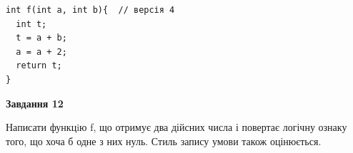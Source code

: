 \documentclass[12pt, ukrainian]{article}
\begin{document}
{\begin {large}
\begin{minipage}[t]{11.0cm}
\vspace{-8mm}\begin{verbatim}
int f(int a, int b){  // версія 4
  int t;
  t = a + b;
  a = a + 2;
  return t;
}
\end{verbatim}



\begin{center}
\textbf{Завдання 12}
\end{center}

Написати функцiю f, що отримує два дійсних числа і повертає логічну ознаку того, що хоча б одне з них нуль. Стиль запису умови також оцінюється.\par

\end{minipage}

\end {large}}
\newpage
\end{document}
